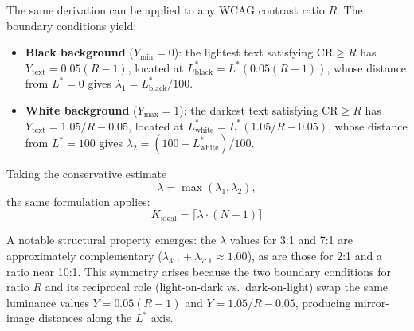 The same derivation can be applied to any WCAG contrast ratio $R$. The boundary conditions yield:
\begin{itemize}
\item \textbf{Black background} ($Y_{\min}=0$): the lightest text satisfying $\mathrm{CR} \ge R$ has $Y_{\text{text}} = 0.05(R-1)$, located at $L^*_{\text{black}} = L^*(0.05(R-1))$, whose distance from $L^*=0$ gives $\lambda_1 = L^*_{\text{black}} / 100$.
\item \textbf{White background} ($Y_{\max}=1$): the darkest text satisfying $\mathrm{CR} \ge R$ has $Y_{\text{text}} = 1.05/R - 0.05$, located at $L^*_{\text{white}} = L^*(1.05/R - 0.05)$, whose distance from $L^*=100$ gives $\lambda_2 = (100 - L^*_{\text{white}}) / 100$.
\end{itemize}

Taking the conservative estimate
\[
\lambda = \max(\lambda_1, \lambda_2),
\]
the same formulation applies:
\[
K_{\text{ideal}} = \lceil \lambda \cdot (N-1) \rceil
\]



A notable structural property emerges: the $\lambda$ values for 3:1 and 7:1 are approximately complementary ($\lambda_{3:1} + \lambda_{7:1} \approx 1.00$), as are those for 2:1 and a ratio near 10:1. This symmetry arises because the two boundary conditions for ratio $R$ and its reciprocal role (light-on-dark vs.\ dark-on-light) swap the same luminance values $Y = 0.05(R-1)$ and $Y = 1.05/R - 0.05$, producing mirror-image distances along the $L^*$ axis.